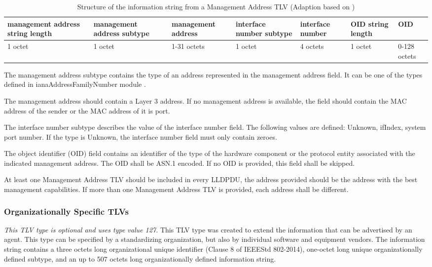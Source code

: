 \begin{table}[h]
    \begin{tabularx}{\linewidth}{|X|X|X|C{4em}|C{4em}|C{3em}|C{3em}|}
        \hline
         management address string length & management address subtype & management address & interface number subtype & interface number & OID string length & OID \\ 
         octet & 1 octet & 1-31 octets & 1 octet & 4 octets & 1 octet & 0-128 octets \\ 
        \hline
    \end{tabularx}
    \caption{Structure of the information string from a Management Address TLV (Adaption based on \cite{IEEE:LLDP:2016})}
    \label{Table:LLDP-ManagementAddressTLVStructure}
\end{table}

The management address subtype contains the type of an address represented in the management address field. It can be one of the types defined in ianaAddressFamilyNumber module \cite{RFC:RFC3232:2002}.

The management address should contain a Layer 3 address. If no management address is available, the field should contain the MAC address of the sender or the MAC address of it is port.

The interface number subtype describes the value of the interface number field. The following values are defined: Unknown, ifIndex, system port number. If the type is Unknown, the interface number field must only contain zeroes.

The object identifier (OID) field contains an identifier of the type of the hardware component or the protocol entity associated with the indicated management address. The OID shall be ASN.1 \cite{ISO:ISO8824-1:2015} encoded. If no OID is provided, this field shall be skipped.

At least one Management Address TLV should be included in every LLDPDU, the address provided should be the address with the best management capabilities. If more than one Management Address TLV is provided, each address shall be different.

\subsubsection{Organizationally Specific TLVs}
\label{Section:LLDP-OrganizationallySpecific}
\textit{This TLV type is optional and uses type value 127.} This TLV type was created to extend the information that can be advertised by an agent. This type can be specified by a standardizing organization, but also by individual software and equipment vendors. The information string contains a three octets long organizational unique identifier (Clause 8 of IEEEStd 802-2014), one-octet long unique organizationally defined subtype, and an up to 507 octets long organizationally defined information string.
